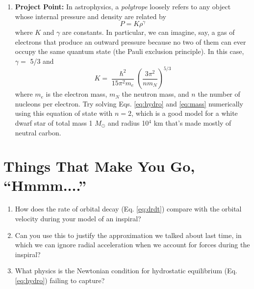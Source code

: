 \documentclass[11pt]{article}
\begin{document}
\begin{enumerate}
\item \textbf{Project Point:} In astrophysics, a \textit{polytrope} loosely refers to any object whose internal pressure and density are related by
\begin{equation}\label{eq:polytrope}
P = K \rho^{\gamma}
\end{equation}
where $K$ and $\gamma$ are constants. In particular, we can imagine, say, a gas of electrons that produce an outward pressure because no two of them can ever occupy the same quantum state (the Pauli exclusion principle). In this case, $\gamma =$ 5/3 and
\[ K = \frac{\hslash^2}{15\pi^2 m_e} \left( \frac{3\pi^2}{n m_N} \right)^{5/3} \]
where $m_e$ is the electron mass, $m_N$ the neutron mass, and $n$ the number of nucleons per electron. Try solving Eqs. \ref{eq:hydro} and \ref{eq:mass} numerically using this equation of state with $n=2$, which is a good model for a white dwarf star of total mass 1 $M_{\odot}$ and radius 10$^4$ km that's made mostly of neutral carbon.

\end{enumerate}


\section*{Things That Make You Go, ``Hmmm....''}

\begin{enumerate}

\item How does the rate of orbital decay (Eq. \ref{eq:drdt}) compare with the orbital velocity during your model of an inspiral?

\item Can you use this to justify the approximation we talked about last time, in which we can ignore radial acceleration when we account for forces during the inspiral?

\item What physics is the Newtonian condition for hydrostatic equilibrium (Eq. \ref{eq:hydro}) failing to capture?

\end{enumerate}

\vspace{1000pt}
\end{document}
